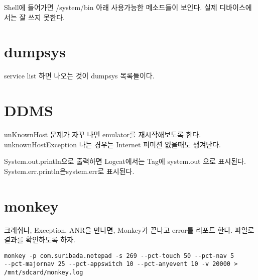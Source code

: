 Shell에 들어가면 /system/bin 아래 사용가능한 메소드들이 보인다. 실제 디바이스에서는 잘 쓰지 못한다.

\section{dumpsys}
service list 하면 나오는 것이 dumpsys 목록들이다.

\section{DDMS}
unKnownHost 문제가 자꾸 나면 emulator를 재시작해보도록 한다.
unknownHostException 나는 경우는 Internet 퍼미션 없을때도 생겨난다.

System.out.println으로 출력하면 Logcat에서는 Tag에 system.out 으로 표시된다.
System.err.println은system.err로 표시된다.

\section{monkey}
크래쉬나, Exception, ANR을 만나면, Monkey가 끝나고 error를 리포트 한다.
파일로 결과를 확인하도록 하자.
\begin{verbatim}
monkey -p com.suribada.notepad -s 269 --pct-touch 50 --pct-nav 5 
--pct-majornav 25 --pct-appswitch 10 --pct-anyevent 10 -v 20000 > /mnt/sdcard/monkey.log
\end{verbatim}

